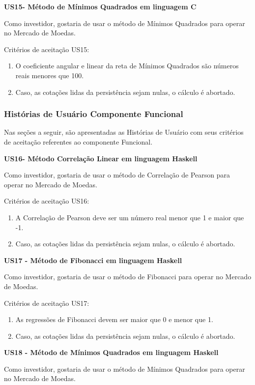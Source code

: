 \textbf{US15- Método de Mínimos Quadrados em linguagem C}

Como investidor, gostaria de usar o método de Mínimos Quadrados para operar no Mercado de Moedas.

Critérios de aceitação US15:
\begin{enumerate}
\item O coeficiente angular e linear da reta de Mínimos Quadrados são números reais menores que 100.
\item Caso, as cotações lidas da persistência sejam nulas, o cálculo é abortado.
\end{enumerate}

\subsubsection{Histórias de Usuário Componente Funcional}
Nas seções a seguir, são apresentadas as Histórias de Usuário com seus critérios de aceitação referentes ao componente Funcional.

\textbf{US16- Método Correlação Linear em linguagem Haskell}

Como investidor, gostaria de usar o método de Correlação de Pearson para operar no Mercado de Moedas.

Critérios de aceitação US16:
\begin{enumerate}
\item A Correlação de Pearson deve ser um número real menor que 1 e maior que -1.
\item Caso, as cotações lidas da persistência sejam nulas, o cálculo é abortado.
\end{enumerate}

\textbf{US17 - Método de Fibonacci em linguagem Haskell}

Como investidor, gostaria de usar o método de Fibonacci para operar no Mercado de Moedas.

Critérios de aceitação US17:
\begin{enumerate}
\item As regressões de Fibonacci devem ser maior que 0 e menor que 1.
\item Caso, as cotações lidas da persistência sejam nulas, o cálculo é abortado.
\end{enumerate}

\textbf{US18 - Método de Mínimos Quadrados em linguagem Haskell}

Como investidor, gostaria de usar o método de Mínimos Quadrados para operar no Mercado de Moedas.

